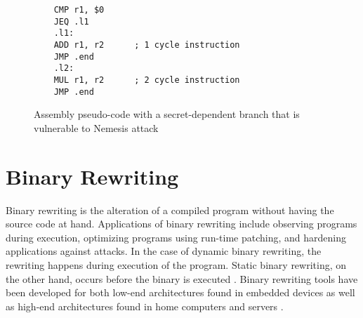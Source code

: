 \lstset{language=[x64]Assembler, numbers=left, stepnumber=1, frame=single}
\begin{figure}

    \begin{lstlisting}
	CMP r1, $0
	JEQ .l1
	.l1: 
	ADD r1, r2 		; 1 cycle instruction
	JMP .end
	.l2: 
	MUL r1, r2 		; 2 cycle instruction
	JMP .end
	\end{lstlisting}
	\caption{Assembly pseudo-code with a secret-dependent branch that is vulnerable to Nemesis attack}
	\label{fig:pseudo-assembly}
\end{figure}


\section{Binary Rewriting}
\label{sec:rewriting}
Binary rewriting is the alteration of a compiled program without having the source code at hand. 
Applications of binary rewriting include observing programs during execution, optimizing programs using run-time patching, and 
hardening applications against attacks. In the case of dynamic binary rewriting, the rewriting happens during execution of the program. 
Static binary rewriting, on the other hand, occurs before the binary is executed \cite{rewriting-survey}. 
Binary rewriting tools have been developed for both low-end architectures found in embedded devices \cite{microsbs} as well as high-end architectures found in home computers and servers 
\cite{ instruction-punning, Dinesh2020RetroWriteSI, E9Patch}. 
